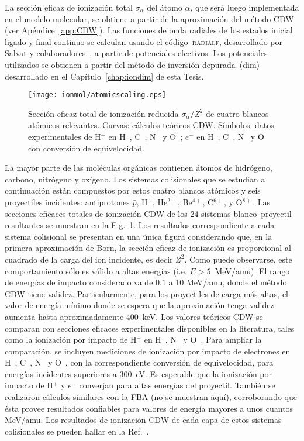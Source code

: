 La sección eficaz de ionización total $\sigma_{\alpha}$ del átomo 
$\alpha$, que será luego implementada en el modelo molecular, se obtiene 
a partir de la aproximación del método CDW (ver Apéndice~\ref{app:CDW}). 
Las funciones de onda radiales de los estados inicial ligado y final 
continuo se calculan usando el código~\textsc{radialf}, desarrollado por 
Salvat y colaboradores~\cite{salvat1995}, a partir de potenciales 
efectivos. Los potenciales utilizados se obtienen a partir del método de 
inversión depurada~(\acs{dim}) desarrollado en el 
Capítulo~\ref{chap:iondim} de esta Tesis. 

\begin{figure}
\centering
\texttt{[image: ionmol/atomicscaling.eps]}
\caption[Sección eficaz total de ionización atómica CDW reducida.]
{Sección eficaz total de ionización reducida $\sigma_{\alpha}/Z^2$ 
de cuatro blancos atómicos relevantes. Curvas: cálculos teóricos CDW. 
Símbolos: datos experimentales de H$^+$ en H~\cite{Shah:81}, 
C~\cite{Toburen:72}, N~\cite{Rudd:85} y O~\cite{Rudd:85}; $e^-$ en 
H~\cite{Shah:87}, C~\cite{Brook:78}, N~\cite{Brook:78} y 
O~\cite{Thompson:95} con conversión de equivelocidad.}
\label{fig:atomscaling}
\end{figure} 

La mayor parte de las moléculas orgánicas contienen átomos de hidrógeno, 
carbono, nitrógeno y oxígeno. Los sistemas colisionales que se estudian 
a continuación están compuestos por estos cuatro blancos atómicos 
y seis proyectiles incidentes: antiprotones $\bar{p}$, H$^{+}$, 
He$^{2+}$, Be$^{4+}$, C$^{6+}$, y O$^{8+}$. Las secciones eficaces 
totales de ionización CDW de los 24 sistemas blanco--proyectil 
resultantes se muestran en la Fig.~\ref{fig:atomscaling}. Los resultados 
correspondiente a cada sistema colisional se presentan en una única 
figura considerando que, en la primera aproximación de Born, la sección 
eficaz de ionización es proporcional al cuadrado de la carga del ion 
incidente, es decir $Z^{2}$. Como puede observarse, este comportamiento 
sólo es válido a altas energías (i.e. $E>5$~MeV/amu). El rango de 
energías de impacto considerado va de $0.1$ a 10 MeV/amu, donde el 
método CDW tiene validez. Particularmente, para los proyectiles de carga 
más altas, el valor de energía mínimo donde se espera que la 
aproximación tenga validez aumenta hasta aproximadamente 400~keV. Los 
valores teóricos CDW se comparan con secciones eficaces experimentales 
disponibles en la literatura, tales como la ionización por impacto de 
H$^+$ en H~\cite{Shah:81}, N~\cite{Rudd:85} y O~\cite{Rudd:85}. Para 
ampliar la comparación, se incluyen mediciones de ionización por impacto 
de electrones en H~\cite{Shah:87}, C~\cite{Brook:78}, N~\cite{Brook:78} 
y O~\cite{Thompson:95}, con la correspondiente conversión de 
equivelocidad, para energías incidentes superiores a 300~eV. Es 
esperable que la ionización por impacto de H$^+$ y $e^-$ converjan para 
altas energías del proyectil. También se realizaron cálculos similares 
con la FBA (no se muestran aquí), corroborando que ésta provee 
resultados confiables para valores de energía mayores a unos cuantos 
MeV/amu. Los resultados de ionización CDW de cada capa de estos sistemas 
colisionales se pueden hallar en la Ref.~\cite{Miraglia:19}.

